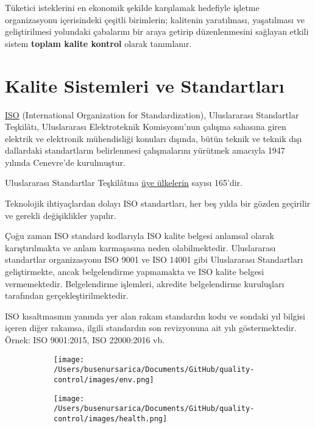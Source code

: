 \documentclass[
]{book}
\begin{document}
Tüketici isteklerini en ekonomik şekilde karşılamak hedefiyle işletme organizasyonu içerisindeki çeşitli birimlerin; kalitenin yaratılması, yaşatılması ve geliştirilmesi yolundaki çabalarını bir araya getirip düzenlenmesini sağlayan etkili sistem \textbf{toplam kalite kontrol} olarak tanımlanır.

\hypertarget{kalite-sistemleri-ve-standartlarux131}{%
\section{Kalite Sistemleri ve Standartları}\label{kalite-sistemleri-ve-standartlarux131}}

\href{https://www.iso.org/home.html}{ISO} (International Organization for Standardization), Uluslararası Standartlar Teşkilâtı, Uluslararası Elektroteknik Komisyonu'nun çalışma sahasına giren elektrik ve elektronik mühendisliği konuları dışında, bütün teknik ve teknik dışı dallardaki standartların belirlenmesi çalışmalarını yürütmek amacıyla 1947 yılında Cenevre'de kurulmuştur.

Uluslararası Standartlar Teşkilâtına \href{https://www.iso.org/members.html}{üye ülkelerin} sayısı 165'dir.

Teknolojik ihtiyaçlardan dolayı ISO standartları, her beş yılda bir gözden geçirilir ve gerekli değişiklikler yapılır.

Çoğu zaman ISO standard kodlarıyla ISO kalite belgesi anlamsal olarak karıştırılmakta ve anlam karmaşasına neden olabilmektedir. Uluslararası standartlar organizasyonu ISO 9001 ve ISO 14001 gibi Uluslararası Standartları geliştirmekte, ancak belgelendirme yapmamakta ve ISO kalite belgesi vermemektedir. Belgelendirme işlemleri, akredite belgelendirme kuruluşları tarafından gerçekleştirilmektedir.

ISO kısaltmasının yanında yer alan rakam standardın kodu ve sondaki yıl bilgisi içeren diğer rakamsa, ilgili standardın son revizyonuna ait yılı göstermektedir. Örnek: ISO 9001:2015, ISO 22000:2016 vb.

\begin{figure}
\begin{subfigure}[h]{0.5\linewidth}
\texttt{[image: /Users/busenursarica/Documents/GitHub/quality-control/images/env.png]}
\end{subfigure}
\hfill
\begin{subfigure}[h]{0.5\linewidth}
\texttt{[image: /Users/busenursarica/Documents/GitHub/quality-control/images/health.png]}
\end{subfigure}%
\end{figure}
\end{document}
